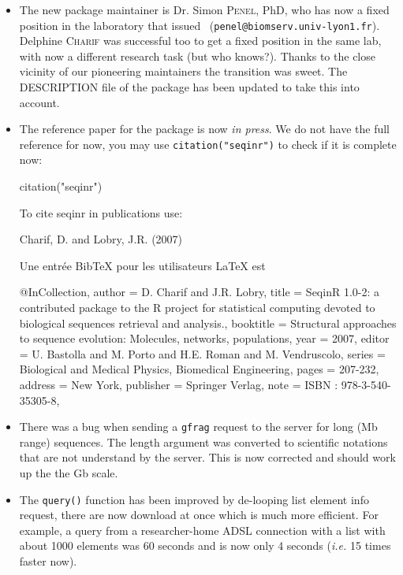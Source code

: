 \documentclass{article}
\begin{document}
\begin{itemize}
\item The new package maintainer is Dr. Simon \textsc{Penel}, PhD, who has now a fixed position in the laboratory that issued \seqinr~(\texttt{penel@biomserv.univ-lyon1.fr}). Delphine \textsc{Charif} was
successful too to get a fixed position in the same lab, with now a different research task (but who knows?).
Thanks to the close vicinity of our pioneering maintainers the transition was sweet. The DESCRIPTION
file of the \seqinr{} package has been updated to take this into account.

\item The reference paper for the package is now \textit{in press}. We do not have the full
reference for now, you may use \texttt{citation("seqinr")} to check if it is complete now:
\begin{Schunk}
\begin{Sinput}
 citation("seqinr")
\end{Sinput}
\begin{Soutput}
To cite seqinr in publications use:

  Charif, D. and Lobry, J.R. (2007)

Une entrée BibTeX pour les utilisateurs LaTeX est

  @InCollection{,
    author = {D. Charif and J.R. Lobry},
    title = {Seqin{R} 1.0-2: a contributed package to the {R} project for statistical computing devoted to biological sequences retrieval and analysis.},
    booktitle = {Structural approaches to sequence evolution: Molecules, networks, populations},
    year = {2007},
    editor = {U. Bastolla and M. Porto and H.E. Roman and M. Vendruscolo},
    series = {Biological and Medical Physics, Biomedical Engineering},
    pages = {207-232},
    address = {New York},
    publisher = {Springer Verlag},
    note = {{ISBN :} 978-3-540-35305-8},
  }
\end{Soutput}
\end{Schunk}

\item There was a bug when sending a \texttt{gfrag} request to the server for long (Mb range)
sequences. The length argument was converted to scientific notations that are not understand by the
server. This is now corrected and should work up the the Gb scale.

\item The \texttt{query()} function has been improved by de-looping list element info request,
there are now download at once which is much more efficient. For example, a query from a
researcher-home ADSL connection with a list with about 1000 elements was 60 seconds and
is now only 4 seconds (\textit{i.e.} 15 times faster now).


\end{itemize}
\end{document}
